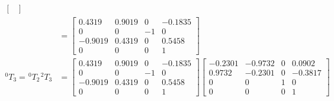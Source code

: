 \begin{equation*}
\begin{split}
\begin{bmatrix}
                                                                                                       \end{bmatrix} \\
                                                                  & =\begin{bmatrix}
                                                                         0.4319  & 0.9019 & 0  & -0.1835 \\
                                                                         0       & 0      & -1 & 0       \\
                                                                         -0.9019 & 0.4319 & 0  & 0.5458  \\
                                                                         0       & 0      & 0  & 1
                                                                     \end{bmatrix}                                  \\
        ^{0}T_{3} = \hspace{1pt} ^{0}T_{2} \hspace{1pt} ^{2}T_{3} & = \begin{bmatrix}
                                                                          0.4319  & 0.9019 & 0  & -0.1835 \\
                                                                          0       & 0      & -1 & 0       \\
                                                                          -0.9019 & 0.4319 & 0  & 0.5458  \\
                                                                          0       & 0      & 0  & 1
                                                                      \end{bmatrix}\begin{bmatrix}
                                                                                       -0.2301 & -0.9732 & 0 & 0.0902  \\
                                                                                       0.9732  & -0.2301 & 0 & -0.3817 \\
                                                                                       0       & 0       & 1 & 0       \\
                                                                                       0       & 0       & 0 & 1
                                                                                   \end{bmatrix}                    \\

\end{split}
\end{equation*}
